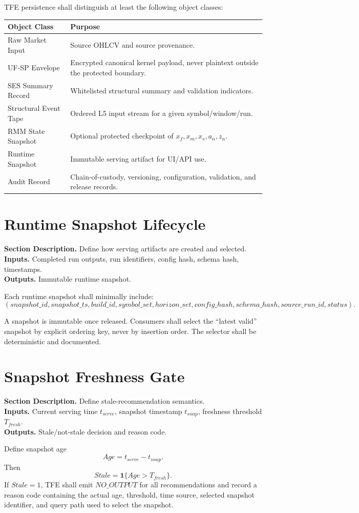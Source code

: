 \documentclass[11pt]{report}
\newcommand{\meta}[3]{\textbf{Section Description.} #1\\
\textbf{Inputs.} #2\\
\textbf{Outputs.} #3\par}
\begin{document}
TFE persistence shall distinguish at least the following object classes:
\begin{longtable}{p{}p{}}
\toprule
Object Class & Purpose \\
\midrule
Raw Market Input & Source OHLCV and source provenance. \\
UF-SP Envelope & Encrypted canonical kernel payload, never plaintext outside the protected boundary. \\
SES Summary Record & Whitelisted structural summary and validation indicators. \\
Structural Event Tape & Ordered L5 input stream for a given symbol/window/run. \\
RMM State Snapshot & Optional protected checkpoint of $x_f,x_m,x_s,a_n,z_n$. \\
Runtime Snapshot & Immutable serving artifact for UI/API use. \\
Audit Record & Chain-of-custody, versioning, configuration, validation, and release records. \\
\bottomrule
\end{longtable}

\section{Runtime Snapshot Lifecycle}
\meta{Define how serving artifacts are created and selected.}{Completed run outputs, run identifiers, config hash, schema hash, timestamps.}{Immutable runtime snapshot.}

Each runtime snapshot shall minimally include:
\[
(snapshot\_id, snapshot\_ts, build\_id, symbol\_set, horizon\_set, config\_hash, schema\_hash, source\_run\_id, status).
\]

A snapshot is immutable once released. Consumers shall select the ``latest valid'' snapshot by explicit ordering key, never by insertion order. The selector shall be deterministic and documented.

\section{Snapshot Freshness Gate}
\meta{Define stale-recommendation semantics.}{Current serving time $t_{serve}$, snapshot timestamp $t_{snap}$, freshness threshold $T_{fresh}$.}{Stale/not-stale decision and reason code.}

Define snapshot age
\[
Age = t_{serve}-t_{snap}.
\]
Then
\[
Stale = \mathbf{1}\{Age > T_{fresh}\}.
\]
If $Stale=1$, TFE shall emit $NO\_OUTPUT$ for all recommendations and record a reason code containing the actual age, threshold, time source, selected snapshot identifier, and query path used to select the snapshot.
\end{document}
